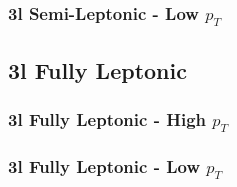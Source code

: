 \subsubsection{3l Semi-Leptonic - Low $p_T$}
\label{sec:3lSLow}

\subsection{3l Fully Leptonic}
\label{sec:3lFSigBkg}

\subsubsection{3l Fully Leptonic - High $p_T$}
\label{sec:3lFHigh}

\subsubsection{3l Fully Leptonic - Low $p_T$}
\label{sec:3lFLow}



